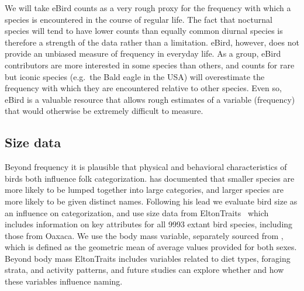 \documentclass[10pt,letterpaper]{article}
\begin{document}
We will take eBird counts as a very rough proxy for the frequency with which a species is encountered in the course of regular life. The fact that nocturnal species will tend to have lower counts than equally common diurnal species is therefore a strength of the data rather than a limitation. eBird, however,  does not provide an unbiased measure of frequency in everyday life. As a group, eBird contributors are more interested in some species than others, and counts for rare but iconic species (e.g.\ the Bald eagle in the USA) will overestimate the frequency with which they are encountered relative to other species. Even so, eBird is a valuable resource that allows rough estimates of a variable (frequency) that would otherwise be extremely difficult to measure.  


\subsection{Size data}
Beyond frequency it is plausible that physical and behavioral characteristics of birds both influence folk categorization.  has documented that smaller species are more likely to be lumped together into large categories, and larger species are more likely to be given distinct names. Following his lead we evaluate bird size as an influence on categorization, and use size data from EltonTraits~\cite{wilman2014eltontraits} which includes information on key attributes for all 9993 extant bird species, including those from Oaxaca.  We use the body mass variable, separately sourced from \cite{dunning2007crc}, which is defined as the geometric mean of average values provided for both sexes. Beyond body mass EltonTraits includes variables related to diet types, foraging strata, and activity patterns, and future studies can explore whether and how these variables influence naming. 
\end{document}
